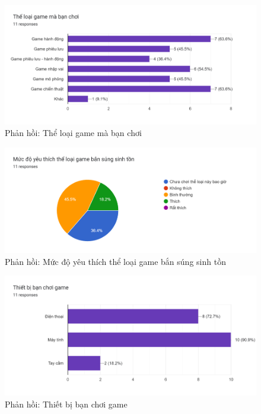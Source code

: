 \documentclass[12pt,a4paper]{article}
\begin{document}
  \begin{figure}[H]
      \centering
      \includegraphics[width=\textwidth]{Img/response/response3.png}
      \caption{Phản hồi: Thể loại game mà bạn chơi}
  \end{figure}

  \begin{figure}[H]
      \centering
      \includegraphics[width=\textwidth]{Img/response/response4.png}
      \caption{Phản hồi: Mức độ yêu thích thể loại game bắn súng sinh tồn}
  \end{figure}

  \begin{figure}[H]
      \centering
      \includegraphics[width=\textwidth]{Img/response/response5.png}
      \caption{Phản hồi: Thiết bị bạn chơi game}
  \end{figure}
\end{document}
